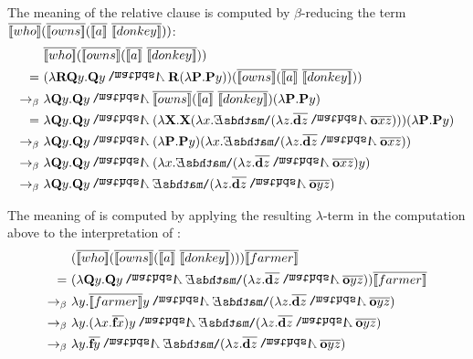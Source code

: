 \begin{example}
The meaning of the relative clause  is computed by $\beta$-reducing the term $\tr{\I{who}}  (\tr{\I{owns}}  (\tr{\I{a}} \ \tr{\I{donkey}} ))$:
\begin{align*}
 & \tr{\I{who}}  (\tr{\I{owns}}  (\tr{\I{a}} \ \tr{\I{donkey}} )) \\
 = \ & (\lambda \R2 \Q2 \y1.  \Q2 \y1 \cnj2  \R2 (\lambda \P2. \P2 \y1 ) ) (\tr{\I{owns}}  (\tr{\I{a}} \ \tr{\I{donkey}} )) \\
\bconv \ &  \lambda \Q2 \y1. \Q2 \y1 \cnj2  \tr{\I{owns}}  (\tr{\I{a}} \ \tr{\I{donkey}}) (\lambda \P2. \P2 \y1)   \\
= \ & \lambda \Q2 \y1. \Q2 \y1 \cnj2  ( \lambda \X2. \X2 ( \lambda \x1.  \ex2 (\lambda \z1.  \tr{\cdonkey \z1}\cnj2 \tr{\cown  \x1 \z1 } ) ) )  (\lambda \P2. \P2 \y1)   \\
\bconv \ & \lambda \Q2 \y1.  \Q2 \y1 \cnj2  ( \lambda \P2. \P2 \y1) ( \lambda \x1.  \ex2 (\lambda \z1.  \tr{\cdonkey \z1}\cnj2 \tr{\cown  \x1 \z1 } ) )     \\
\bconv \ & \lambda \Q2 \y1. \Q2 \y1 \cnj2  (   \lambda \x1.  \ex2 (\lambda \z1.   \tr{\cdonkey \z1}\cnj2 \tr{\cown  \x1 \z1 } )    \y1)   \\
\bconv \ & \lambda \Q2 \y1.  \Q2 \y1 \cnj2   \ex2 (\lambda \z1.  \tr{\cdonkey \z1}\cnj2 \tr{\cown  \y1 \z1 } ) 
\end{align*}

The meaning of  is computed by applying the resulting $\lambda$-term in the computation above to the interpretation of :
\begin{align*}
& (\tr{\I{who}}  (\tr{\I{owns}}  (\tr{\I{a}} \ \tr{\I{donkey}} ) ) )\tr{\I{farmer}} \\
 = \ & (\lambda \Q2 \y1.  \Q2 \y1 \cnj2   \ex2 (\lambda \z1.  \tr{\cdonkey \z1}\cnj2 \tr{\cown \y1 \z1}  )) \tr{\I{farmer}} \\
\bconv \ & \lambda  \y1.  \tr{\I{farmer}} \y1 \cnj2   \ex2 (\lambda \z1.  \tr{\cdonkey \z1}\cnj2 \tr{\cown \y1 \z1}  )   \\ 
\bconv \ & \lambda  \y1.  (\lambda \x1.\tr{\cfarmer\x1}) \y1 \cnj2   \ex2 (\lambda \z1.  \tr{\cdonkey \z1}\cnj2 \tr{\cown \y1 \z1}  )   \\ 
\bconv \ & \lambda  \y1.  \tr{\cfarmer \y1} \cnj2   \ex2 (\lambda \z1.  \tr{\cdonkey \z1}\cnj2 \tr{\cown \y1 \z1} )   
\end{align*}


\end{example}

